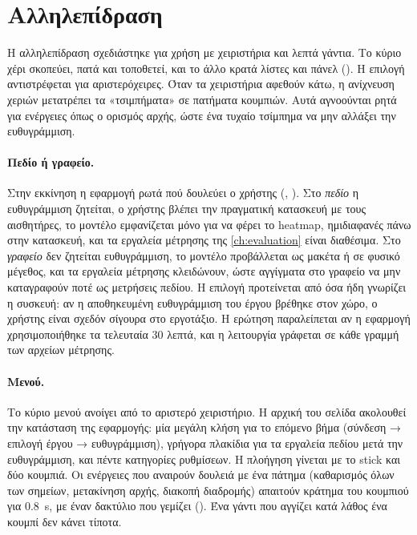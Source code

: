 
\section{Αλληλεπίδραση}
\label{sec:impl-interaction}

Η αλληλεπίδραση σχεδιάστηκε για χρήση με χειριστήρια και λεπτά γάντια. Το κύριο χέρι σκοπεύει, πατά και τοποθετεί, και το άλλο κρατά λίστες και πάνελ (). Η επιλογή αντιστρέφεται για αριστερόχειρες. Όταν τα χειριστήρια αφεθούν κάτω, η ανίχνευση χεριών μετατρέπει τα «τσιμπήματα» σε πατήματα κουμπιών. Αυτά αγνοούνται ρητά για ενέργειες όπως ο ορισμός αρχής, ώστε ένα τυχαίο τσίμπημα να μην αλλάξει την ευθυγράμμιση.

\paragraph{Πεδίο ή γραφείο.} Στην εκκίνηση η εφαρμογή ρωτά πού δουλεύει ο χρήστης (, ). Στο \emph{πεδίο} η ευθυγράμμιση ζητείται, ο χρήστης βλέπει την πραγματική κατασκευή με τους αισθητήρες, το μοντέλο εμφανίζεται μόνο για να φέρει το heatmap, ημιδιαφανές πάνω στην κατασκευή, και τα εργαλεία μέτρησης της \cref{ch:evaluation} είναι διαθέσιμα. Στο \emph{γραφείο} δεν ζητείται ευθυγράμμιση, το μοντέλο προβάλλεται ως μακέτα ή σε φυσικό μέγεθος, και τα εργαλεία μέτρησης κλειδώνουν, ώστε αγγίγματα στο γραφείο να μην καταγραφούν ποτέ ως μετρήσεις πεδίου. Η επιλογή προτείνεται από όσα ήδη γνωρίζει η συσκευή: αν η αποθηκευμένη ευθυγράμμιση του έργου βρέθηκε στον χώρο, ο χρήστης είναι σχεδόν σίγουρα στο εργοτάξιο. Η ερώτηση παραλείπεται αν η εφαρμογή χρησιμοποιήθηκε τα τελευταία 30 λεπτά, και η λειτουργία γράφεται σε κάθε γραμμή των αρχείων μέτρησης.

\paragraph{Μενού.} Το κύριο μενού ανοίγει από το αριστερό χειριστήριο. Η αρχική του σελίδα ακολουθεί την κατάσταση της εφαρμογής: μία μεγάλη κλήση για το επόμενο βήμα (σύνδεση → επιλογή έργου → ευθυγράμμιση), γρήγορα πλακίδια για τα εργαλεία πεδίου μετά την ευθυγράμμιση, και πέντε κατηγορίες ρυθμίσεων. Η πλοήγηση γίνεται με το stick και δύο κουμπιά. Οι ενέργειες που αναιρούν δουλειά με ένα πάτημα (καθαρισμός όλων των σημείων, μετακίνηση αρχής, διακοπή διαδρομής) απαιτούν κράτημα του κουμπιού για \SI{0.8}{s}, με έναν δακτύλιο που γεμίζει (). Ένα γάντι που αγγίζει κατά λάθος ένα κουμπί δεν κάνει τίποτα.

